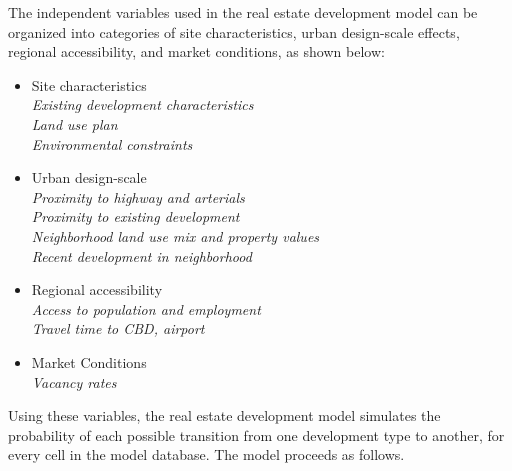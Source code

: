 \documentclass[fleqn]{article}
\begin{document}
The independent variables used in the real estate development
model can be organized into categories of site characteristics,
urban design-scale effects, regional accessibility, and market
conditions, as shown below:

\begin{itemize}
\item Site characteristics \\
\hspace*{2 mm} \emph{Existing development characteristics \\
\hspace*{2 mm} Land use plan \\
\hspace*{2 mm} Environmental constraints}

\item Urban design-scale \\
\hspace*{2 mm} \emph{Proximity to highway and arterials \\
\hspace*{2 mm} Proximity to existing development \\
\hspace*{2 mm} Neighborhood land use mix and property values \\
\hspace*{2 mm} Recent development in neighborhood}

\item Regional accessibility \\
\hspace*{2 mm} \emph{Access to population and employment \\
\hspace*{2 mm} Travel time to CBD, airport}

\item Market Conditions \\
\hspace*{2 mm} \emph{Vacancy rates}
\end{itemize}


Using these variables, the real estate development model simulates
the probability of each possible transition from one development
type to another, for every cell in the model database. The model
proceeds as follows.
\end{document}
